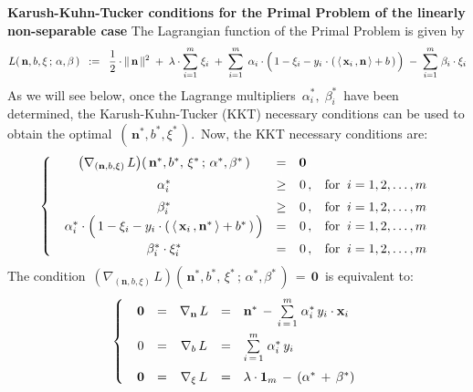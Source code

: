 \vskip 0.5cm
\noindent
\textbf{Karush-Kuhn-Tucker conditions for the Primal Problem of the linearly non-separable case}
\vskip 0.1cm
\noindent
The Lagrangian function of the Primal Problem is given by
\begin{equation*}
L(\,\mathbf{n},b,\xi\,;\,\alpha,\beta\,)
\;\; := \;\;
	\dfrac{1}{2}\cdot\Vert\,\mathbf{n}\,\Vert^{2}
	\; + \;
	\lambda\cdot\overset{m}{\underset{i=1}{\sum}}\;\xi_{i}
	\; + \;
	\overset{m}{\underset{i = 1}{\sum}}\;\,
		\alpha_{i}
		\cdot
		\left(\,
			1 - \xi_{i}
			-
			y_{i}\overset{{\color{white}1}}{\cdot}\left(\,
				\langle\,\mathbf{x}_{i}\,,\mathbf{n}\,\rangle + b
				\,\right)
			\,\right)
	\; - \;
	\overset{m}{\underset{i = 1}{\sum}}\;
		\beta_{i}
		\cdot
		\xi_{i}
\end{equation*}
As we will see below, {\color{red}once the Lagrange multipliers \,$\alpha_{i}^{*},\; \beta_{i}^{*}$\,
have been determined, the Karush-Kuhn-Tucker (KKT) necessary conditions
can be used to obtain the optimal \,$(\,\mathbf{n}^{*},b^{*},\xi^{*}\,)$}.\,
Now, the KKT necessary conditions are:
\begin{equation*}
\left\{\;\;
	\begin{array}{cccc}
	\left(\nabla_{(\mathbf{n},b,\xi)}\,L\right)\!(\,\mathbf{n}^{*},b^{*},\,\xi^{*}\,;\,\alpha^{*},\beta^{*}\,) & = & \mathbf{0}\,{\color{white},}
	\\
	\alpha_{i}^{*} & \overset{{\color{white}1}}{\geq} & 0\,, & \textnormal{for}\;\; i = 1,2,\ldots,m
	\\
	\beta_{i}^{*} & \overset{{\color{white}1}}{\geq} & 0\,, & \textnormal{for}\;\; i = 1,2,\ldots,m
	\\
	\alpha_{i}^{*} \cdot \left(\,
		\overset{{\color{white}.}}{1} - \xi_{i} - y_{i}\cdot\left(\, \langle\,\mathbf{x}_{i}\,,\mathbf{n}^{*}\,\rangle + b^{*} \,\right)
		\,\right)
		& = & 0\,, & \textnormal{for}\;\; i = 1,2,\ldots,m
	\\
	\beta_{i}^{*} \cdot \xi_{i}^{*} & \overset{{\color{white}1}}{=} & 0\,, & \textnormal{for}\;\; i = 1,2,\ldots,m
	\end{array}
	\right.
\end{equation*}
The condition
\,$\left(\nabla_{(\mathbf{n},b,\xi)}\,L\right)\!(\,\mathbf{n}^{*},b^{*},\,\xi^{*}\,;\,\alpha^{*},\beta^{*}\,) \,=\, \mathbf{0}$\,
is equivalent to:
\begin{equation*}
\left\{\;\;
\begin{array}{ccccl}
\mathbf{0}
& = &
	\nabla_{\mathbf{n}}\,L
& = &
	\mathbf{n}^{*} \, - \, \overset{m}{\underset{i\,=\,1}{\sum}}\;\alpha_{i}^{*}\,y_{i}\cdot\mathbf{x}_{i}
\\
0
&=&
	\nabla_{b}\,L
& = &
	\overset{{\color{white}.}}{\overset{m}{\underset{i\,=\,1}{\sum}}\;\alpha_{i}^{*}\,y_{i}}
\\
\mathbf{0}
& = &
	\nabla_{\xi}\,L
& = &
	\overset{{\color{white}1}}{\lambda}\cdot\mathbf{1}_{m} \, - \, (\alpha^{*} \, + \, \beta^{*})
\end{array}
\right.
\end{equation*}
